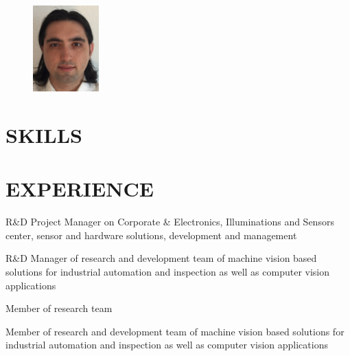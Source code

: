 \documentclass[margin]{res}
\begin{document}
	\address{Bordenbergweg Str. 64367, M\"uhltal\\
		\hspace{.5in}+49 176 62 01 37 66\\
		\hspace{.55in}cihansari86@gmail.com}
	\begin{resume}
		\begin{figure}
			\vspace{-1in}
			\includegraphics[width=1in]{me.jpg}
		\end{figure}
		
		\sectionspace
		\section{SKILLS}
		
		\sectionspace

		\section{EXPERIENCE}
		{R\&D Project Manager on Corporate \& Electronics, Illuminations and Sensors center, sensor and hardware solutions, development and management}
		
		{R\&D Manager of research and development team of machine vision based solutions for industrial automation and inspection as well as computer vision applications}
		
		{Member of research team}
		
		{Member of research and development team of machine vision based solutions for industrial automation and inspection as well as computer vision applications}
		

\end{resume}
\end{document}
